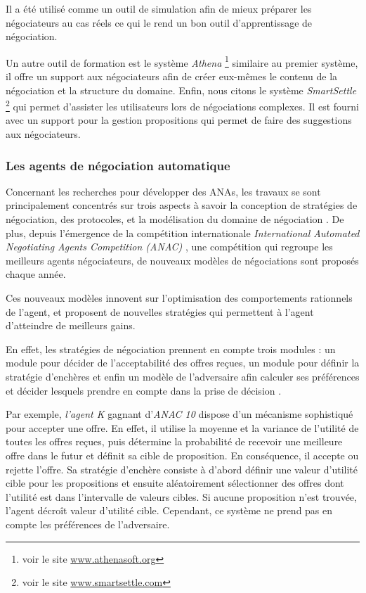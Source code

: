 		Il a été utilisé comme  un outil de simulation afin de mieux préparer les négociateurs au cas réels ce qui le rend un bon outil d'apprentissage de négociation. 
		
		Un autre outil de formation est le système \emph{Athena} \footnote{ voir le site \url{www.athenasoft.org}} similaire au premier système, il offre un support aux négociateurs afin de créer eux-mêmes le contenu de la négociation et la structure du domaine. Enfin, nous citons le système \emph{SmartSettle} \footnote{ voir le site \url{www.smartsettle.com}} qui permet d'assister les utilisateurs lors de négociations complexes. Il est fourni avec un support pour la gestion propositions qui permet de faire des suggestions aux négociateurs. 
		
		\subsubsection{Les agents de négociation automatique}
		
		Concernant les recherches pour développer des ANAs, les travaux se sont principalement concentrés sur trois aspects à savoir la conception de stratégies de négociation, des protocoles, et la modélisation du domaine de négociation \cite{jonker2012negotiating}. De plus, depuis l'émergence de la compétition internationale \emph{International Automated Negotiating Agents Competition (ANAC)} \cite{baarslag2012first,fujita2013second}, une compétition qui regroupe les meilleurs agents négociateurs, de nouveaux modèles de négociations sont proposés chaque année. 
		
		Ces nouveaux modèles innovent sur l'optimisation des comportements rationnels de l'agent, et proposent de nouvelles stratégies qui permettent à l'agent d'atteindre de meilleurs gains. 
		
		En effet, les stratégies de négociation prennent en compte trois modules : un module pour décider de l'acceptabilité des offres reçues, un module pour définir la stratégie d'enchères et enfin un modèle de l'adversaire afin calculer ses préférences et décider lesquels prendre en compte dans la prise de décision \cite{baarslag2014decoupling}.
		
		Par exemple, \textit{l'agent K} \cite{kawaguchi2011compromising} gagnant d'\emph{ANAC 10} dispose d'un mécanisme sophistiqué pour accepter une offre. En effet, il utilise la moyenne et la variance de l'utilité de toutes les offres reçues, puis détermine la probabilité de recevoir une meilleure offre dans le futur et définit sa cible de proposition. En conséquence, il accepte ou rejette l'offre. Sa stratégie d'enchère consiste à d'abord définir une valeur d'utilité cible pour les propositions et ensuite aléatoirement sélectionner des offres dont l'utilité est dans l'intervalle de valeurs cibles. Si aucune proposition n'est trouvée, l'agent décroît valeur d'utilité cible.
		Cependant, ce système ne prend pas en compte les préférences de l'adversaire. 
		
